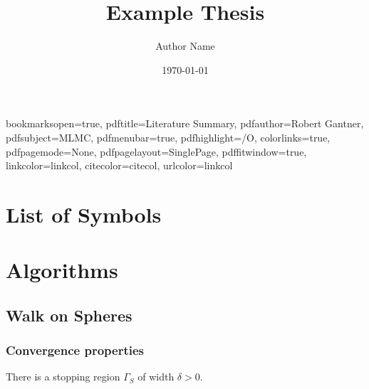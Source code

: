 

\hypersetup
{
bookmarksopen=true,
pdftitle=Literature Summary,
pdfauthor=Robert Gantner,
pdfsubject=MLMC, %
pdfmenubar=true, %
pdfhighlight=/O, %
colorlinks=true, %
pdfpagemode=None, %
pdfpagelayout=SinglePage, %
pdffitwindow=true, %
linkcolor=linkcol, %
citecolor=citecol, %
urlcolor=linkcol %
}

\title{Example Thesis}
\author{Author Name}
\date{\today}

%
%

\maketitle

\tableofcontents
\newpage
\chapter*{List of Symbols\hfill}%
\listofsymbols

\chapter{Algorithms}
\label{cha:algorithms}

\section{Walk on Spheres}
\label{sec:walk_on_spheres}

\subsection{Convergence properties} %
\label{sub:convergence_properties}
There is a stopping region $\Gamma_S$  of width $\delta>0$. 
\cite{Muller}


%
%



